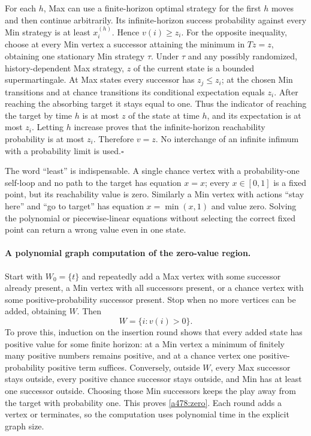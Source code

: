\documentclass[11pt]{article}
\begin{document}
For each $h$, Max can use a finite-horizon optimal strategy for the first
$h$ moves and then continue arbitrarily. Its infinite-horizon success
probability against every Min strategy is at least $x^{(h)}_i$. Hence
$v(i)\geq z_i$. For the opposite inequality, choose at every Min vertex
a successor attaining the minimum in $Tz=z$, obtaining one stationary
Min strategy $\tau$. Under $\tau$ and any possibly randomized,
history-dependent Max strategy, $z$ of the current state is a bounded
supermartingale. At Max states every successor has $z_j\leq z_i$;
at the chosen Min transitions and at chance transitions its conditional
expectation equals $z_i$. After reaching the absorbing target it stays
equal to one. Thus the indicator of reaching the target by time $h$ is
at most $z$ of the state at time $h$, and its expectation is at most
$z_i$. Letting $h$ increase proves that the infinite-horizon reachability
probability is at most $z_i$. Therefore $v=z$. No interchange of an
infinite infimum with a probability limit is used.\hfill$\square$

The word ``least'' is indispensable. A single chance vertex with a
probability-one self-loop and no path to the target has equation $x=x$;
every $x\in[0,1]$ is a fixed point, but its reachability value is zero.
Similarly a Min vertex with actions ``stay here'' and ``go to target''
has equation $x=\min(x,1)$ and value zero. Solving the polynomial or
piecewise-linear equations without selecting the correct fixed point can
return a wrong value even in one state.

\paragraph{A polynomial graph computation of the zero-value region.}
Start with $W_0=\{t\}$ and repeatedly add a Max vertex with some
successor already present, a Min vertex with all successors present, or
a chance vertex with some positive-probability successor present.
Stop when no more vertices can be added, obtaining $W$. Then
\begin{equation}\label{a478:zero}
                          W=\{i:v(i)>0\}.
\end{equation}
To prove this, induction on the insertion round shows that every added
state has positive value for some finite horizon: at a Min vertex a
minimum of finitely many positive numbers remains positive, and at a
chance vertex one positive-probability positive term suffices. Conversely,
outside $W$, every Max successor stays outside, every positive chance
successor stays outside, and Min has at least one successor outside.
Choosing those Min successors keeps the play away from the target with
probability one. This proves \eqref{a478:zero}. Each round adds a vertex
or terminates, so the computation uses polynomial time in the explicit
graph size.
\end{document}
